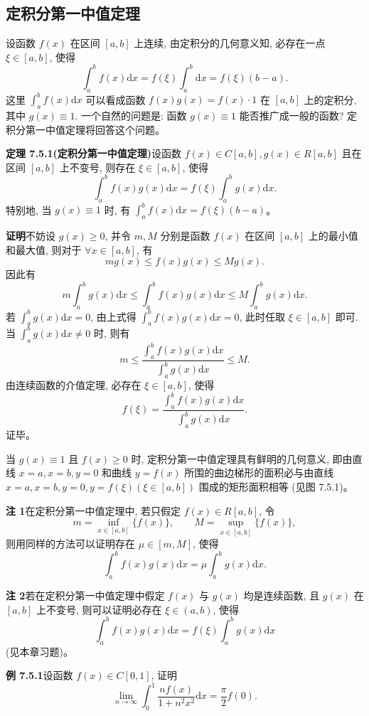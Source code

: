 \documentclass[UTF8,12pt,a4paper,fontset=fandol]{ctexart}
\begin{document}
\subsection{定积分第一中值定理}

设函数 $f(x)$ 在区间 $[a,b]$ 上连续, 由定积分的几何意义知, 必存在一点 $\xi\in[a,b]$, 使得
\[
  \int_a^b f(x)\mathrm dx=f(\xi)\int_a^b\mathrm dx=f(\xi)(b-a).
\]
这里 $\int_a^b f(x)\mathrm dx$ 可以看成函数 $f(x)g(x)=f(x)\cdot1$ 在 $[a,b]$ 上的定积分, 其中 $g(x)\equiv1$. 一个自然的问题是: 函数 $g(x)\equiv1$ 能否推广成一般的函数? 定积分第一中值定理将回答这个问题。

\noindent\textbf{定理 7.5.1(定积分第一中值定理)}\quad 设函数 $f(x)\in C[a,b],g(x)\in R[a,b]$ 且在区间 $[a,b]$ 上不变号, 则存在 $\xi\in[a,b]$, 使得
\[
  \int_a^b f(x)g(x)\mathrm dx=f(\xi)\int_a^b g(x)\mathrm dx.
\]
特别地, 当 $g(x)\equiv1$ 时, 有 $\int_a^b f(x)\mathrm dx=f(\xi)(b-a)$。

\noindent\textbf{证明}\quad 不妨设 $g(x)\geq0$, 并令 $m,M$ 分别是函数 $f(x)$ 在区间 $[a,b]$ 上的最小值和最大值, 则对于 $\forall x\in[a,b]$, 有
\[
  mg(x)\leq f(x)g(x)\leq Mg(x).
\]
因此有
\[
  m\int_a^b g(x)\mathrm dx
  \leq\int_a^b f(x)g(x)\mathrm dx
  \leq M\int_a^b g(x)\mathrm dx.
\]
若 $\int_a^b g(x)\mathrm dx=0$, 由上式得 $\int_a^b f(x)g(x)\mathrm dx=0$, 此时任取 $\xi\in[a,b]$ 即可. 当 $\int_a^b g(x)\mathrm dx\neq0$ 时, 则有
\[
  m\leq
  \frac{\int_a^b f(x)g(x)\mathrm dx}{\int_a^b g(x)\mathrm dx}
  \leq M.
\]
由连续函数的介值定理, 必存在 $\xi\in[a,b]$, 使得
\[
  f(\xi)=
  \frac{\int_a^b f(x)g(x)\mathrm dx}{\int_a^b g(x)\mathrm dx}.
\]
证毕。

当 $g(x)\equiv1$ 且 $f(x)\geq0$ 时, 定积分第一中值定理具有鲜明的几何意义, 即由直线 $x=a,x=b,y=0$ 和曲线 $y=f(x)$ 所围的曲边梯形的面积必与由直线 $x=a,x=b,y=0,y=f(\xi)(\xi\in[a,b])$ 围成的矩形面积相等 (见图 7.5.1)。

\noindent\textbf{注 1}\quad 在定积分第一中值定理中, 若只假定 $f(x)\in R[a,b]$, 令
\[
  m=\inf_{x\in[a,b]}\{f(x)\},\qquad
  M=\sup_{x\in[a,b]}\{f(x)\},
\]
则用同样的方法可以证明存在 $\mu\in[m,M]$, 使得
\[
  \int_a^b f(x)g(x)\mathrm dx=\mu\int_a^b g(x)\mathrm dx.
\]

\noindent\textbf{注 2}\quad 若在定积分第一中值定理中假定 $f(x)$ 与 $g(x)$ 均是连续函数, 且 $g(x)$ 在 $[a,b]$ 上不变号, 则可以证明必存在 $\xi\in(a,b)$, 使得
\[
  \int_a^b f(x)g(x)\mathrm dx=f(\xi)\int_a^b g(x)\mathrm dx
\]
(见本章习题)。

\noindent\textbf{例 7.5.1}\quad 设函数 $f(x)\in C[0,1]$, 证明
\[
  \lim_{n\to\infty}\int_0^1\frac{nf(x)}{1+n^2x^2}\mathrm dx=\frac{\pi}{2}f(0).
\]
\end{document}
